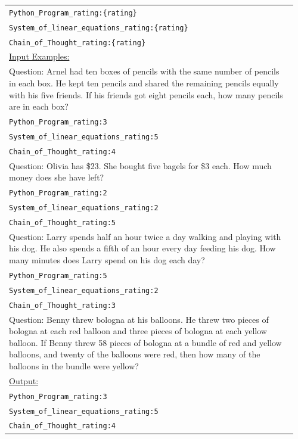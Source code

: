 \documentclass[10pt]{article} %
\begin{document}
\begin{table}[t]
\begin{center}
\begin{tabular}{|p{0.96\linewidth}|}
            \texttt{Python\_Program\_rating:\{rating\}} \\
            \texttt{System\_of\_linear\_equations\_rating:\{rating\}} \\
            \texttt{Chain\_of\_Thought\_rating:\{rating\}} \\
            \hline
            \underline{Input Examples:} \\
            Question: Arnel had ten boxes of pencils with the same number of pencils in each box. He kept ten pencils and shared the remaining pencils equally with his five friends. If his friends got eight pencils each, how many pencils are in each box? \\
            \texttt{Python\_Program\_rating:3} \\
            \texttt{System\_of\_linear\_equations\_rating:5} \\
            \texttt{Chain\_of\_Thought\_rating:4} \\
            Question: Olivia has \$23. She bought five bagels for \$3 each. How much money does she have left? \\
            \texttt{Python\_Program\_rating:2} \\
            \texttt{System\_of\_linear\_equations\_rating:2} \\
            \texttt{Chain\_of\_Thought\_rating:5} \\
            Question: Larry spends half an hour twice a day walking and playing with his dog. He also spends a fifth of an hour every day feeding his dog. How many minutes does Larry spend on his dog each day? \\
            \texttt{Python\_Program\_rating:5} \\
            \texttt{System\_of\_linear\_equations\_rating:2} \\
            \texttt{Chain\_of\_Thought\_rating:3} \\
            \hline
            Question: Benny threw bologna at his balloons.  He threw two pieces of bologna at each red balloon and three pieces of bologna at each yellow balloon.  If Benny threw 58 pieces of bologna at a bundle of red and yellow balloons, and twenty of the balloons were red, then how many of the balloons in the bundle were yellow?\\
            \hline
            \underline{Output:} \\
            \texttt{Python\_Program\_rating:3} \\
            \texttt{System\_of\_linear\_equations\_rating:5} \\
            \texttt{Chain\_of\_Thought\_rating:4} \\
            \hline
            \end{tabular}
            \end{center}
            \end{table}
  
\end{document}
